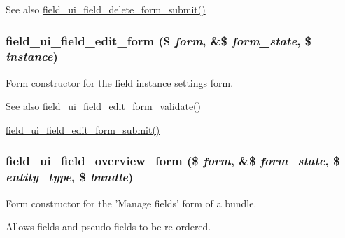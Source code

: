 \begin{DoxySeeAlso}{See also}
\hyperlink{field__ui_8admin_8inc_a643ce47fcd5a52d15e79734b946da76e}{field\_\-ui\_\-field\_\-delete\_\-form\_\-submit()} 
\end{DoxySeeAlso}
\hypertarget{group__forms_ga11660e91b3649ff30bf665c00f1a9af2}{
\subsubsection[{field\_\-ui\_\-field\_\-edit\_\-form}]{\setlength{\rightskip}{0pt plus 5cm}field\_\-ui\_\-field\_\-edit\_\-form (\$ {\em form}, \/  \&\$ {\em form\_\-state}, \/  \$ {\em instance})}}
\label{group__forms_ga11660e91b3649ff30bf665c00f1a9af2}
Form constructor for the field instance settings form.

\begin{DoxySeeAlso}{See also}
\hyperlink{field__ui_8admin_8inc_ae9379c6d84a3dcf100c967a8a0a0f233}{field\_\-ui\_\-field\_\-edit\_\-form\_\-validate()} 

\hyperlink{field__ui_8admin_8inc_a0d4cacca76203d4d7506dedc4781018e}{field\_\-ui\_\-field\_\-edit\_\-form\_\-submit()} 
\end{DoxySeeAlso}
\hypertarget{group__forms_gad62638f853fe251696eb3b57e8111845}{
\subsubsection[{field\_\-ui\_\-field\_\-overview\_\-form}]{\setlength{\rightskip}{0pt plus 5cm}field\_\-ui\_\-field\_\-overview\_\-form (\$ {\em form}, \/  \&\$ {\em form\_\-state}, \/  \$ {\em entity\_\-type}, \/  \$ {\em bundle})}}
\label{group__forms_gad62638f853fe251696eb3b57e8111845}
Form constructor for the 'Manage fields' form of a bundle.

Allows fields and pseudo-\/fields to be re-\/ordered.

